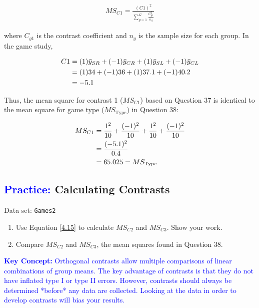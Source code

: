 \documentclass[
]{report}
\begin{document}
\begin{align}\label{4.15}
MS_{C1} = \frac{(C1)^2}{\sum_{g=1}^{G} \frac{C_{g1}^2}{n_g}}
\tag{4.15}
\end{align}

where \(\scriptstyle C_{g1}\) is the contrast coefficient and \(\scriptstyle n_g\) is the sample size for each group. In the game study,

\begin{align}
C1 &= (1)\bar{y}_{SR} + (-1)\bar{y}_{CR} + (1)\bar{y}_{SL} + (-1)\bar{y}_{CL} \notag \\
   &= (1)34 + (-1)36 + (1)37.1 + (-1)40.2 \notag \\
   &= -5.1 \notag
\end{align}

Thus, the mean square for contrast 1 (\(\scriptstyle MS_{C1}\)) based on Question 37 is identical to the mean square for game type (\(\scriptstyle MS_{\text{Type}}\)) in Question 38:

\begin{align}
MS_{C1} &= \frac{1^2}{10} + \frac{(-1)^2}{10} + \frac{1^2}{10} + \frac{(-1)^2}{10} \notag \\
        &= \frac{(-5.1)^2}{0.4} \notag \\
        &= 65.025 = MS_{\text{Type}} \notag
\end{align}

\hypertarget{calculating-contrasts}{%
\subsection*{\texorpdfstring{\textcolor{blue}{Practice:} Calculating Contrasts}{ Calculating Contrasts}}\label{calculating-contrasts}}

Data set: \texttt{Games2}

\begin{enumerate}
\def\labelenumi{\arabic{enumi}.}
\setcounter{enumi}{39}
\item
  Use Equation \ref{4.15} to calculate \(\scriptstyle MS_{C2}\) and \(\scriptstyle MS_{C3}\). Show your work.
\item
  Compare \(\scriptstyle MS_{C2}\) and \(\scriptstyle MS_{C3}\), the mean squares found in Question 38.
\end{enumerate}

\textbf{\textcolor{blue}{Key Concept:}} \textcolor{blue}{Orthogonal contrasts allow multiple comparisons of linear combinations of group means. The key advantage of contrasts is that they do not have inflated type I or type II errors. However, contrasts should always be determined *before* any data are collected. Looking at the data in order to develop contrasts will bias your results.}
\end{document}
